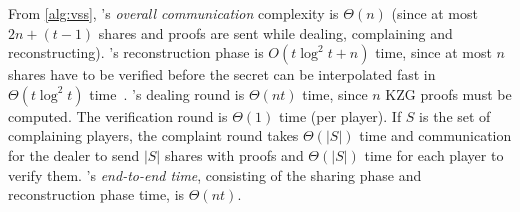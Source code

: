 From \cref{alg:vss}, \evss's \textit{overall communication} complexity is $\Theta(n)$ (since at most $2n+(t-1)$ shares and proofs are sent while dealing, complaining and reconstructing).
\evss's reconstruction phase is $O(t\log^2{t} + n)$ time, since at most $n$ shares have to be verified before the secret can be interpolated fast in $\Theta(t\log^2{t})$ time~\cite{vG13ModernCh10}.
\evss's dealing round is $\Theta(nt)$ time, since $n$ KZG proofs must be computed.
The verification round is $\Theta(1)$ time (per player).
If $S$ is the set of complaining players, the complaint round takes $\Theta(|S|)$ time and communication for the dealer to send $|S|$ shares with proofs and $\Theta(|S|)$ time for each player to verify them.
\evss's \textit{end-to-end time}, consisting of the sharing phase and reconstruction phase time, is $\Theta(nt)$.

